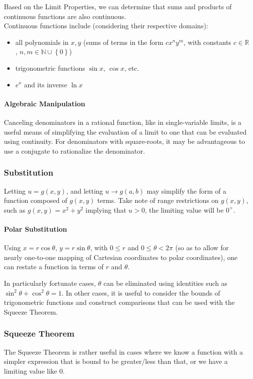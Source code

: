 \documentclass{article}
\begin{document}
Based on the Limit Properties, we can determine that sums and products of continuous functions are also continuous.\\
Continuous functions include (considering their respective domains):
\begin{itemize}
    \item all polynomials in $x,y$ (sums of terms in the form $cx^ny^m$, with constants $c\in\mathbb{R}$, $n,m\in\mathbb{N}\cup\left\{0\right\}$)
    \item trigonometric functions $\sin{x}$, $\cos{x}$, etc.
    \item $e^x$ and its inverse $\ln{x}$
\end{itemize}

\paragraph{Algebraic Manipulation}
Canceling denominators in a rational function, like in single-variable limits, is a useful means of simplifying the evaluation of a limit to one that can be evaluated using continuity. For denominators with square-roots, it may be advantageous to use a conjugate to rationalize the denominator.

\subsubsection{Substitution}
Letting $u=g(x,y)$, and letting $u\to g(a,b)$ may simplify the form of a function composed of $g(x,y)$ terms. Take note of range restrictions on $g(x,y)$, such as $g(x,y)=x^2+y^2$ implying that $u > 0$, the limiting value will be $0^+$.

\paragraph{Polar Substitution}
Using $x = r\cos{\theta}$, $y=r\sin{\theta}$, with $0 \le r$ and $0\le\theta<2\pi$ (so as to allow for nearly one-to-one mapping of Cartesian coordinates to polar coordinates), one can restate a function in terms of $r$ and $\theta$.

In particularly fortunate cases, $\theta$ can be eliminated using identities such as $\sin^2{\theta}+\cos^2{\theta}=1$. In other cases, it is useful to consider the bounds of trigonometric functions and construct comparisons that can be used with the Squeeze Theorem.

\subsubsection{Squeeze Theorem}
The Squeeze Theorem is rather useful in cases where we know a function with a simpler expression that is bound to be greater/less than that, or we have a limiting value like $0$.
\end{document}
